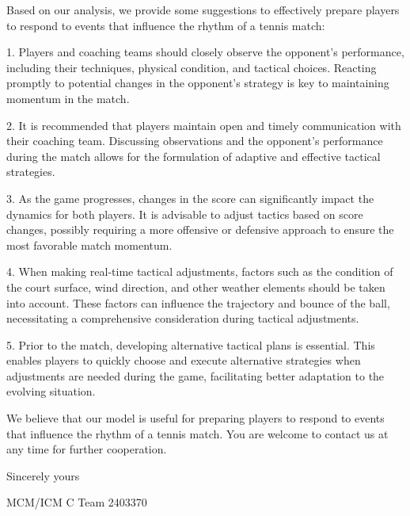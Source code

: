 \documentclass[13pt]{ctexart}
\begin{document}
Based on our analysis, we provide some suggestions to effectively prepare players to respond to events that influence the rhythm of a tennis match:

1. Players and coaching teams should closely observe the opponent's performance, including their techniques, physical condition, and tactical choices. Reacting promptly to potential changes in the opponent's strategy is key to maintaining momentum in the match.

2. It is recommended that players maintain open and timely communication with their coaching team. Discussing observations and the opponent's performance during the match allows for the formulation of adaptive and effective tactical strategies.

3. As the game progresses, changes in the score can significantly impact the dynamics for both players. It is advisable to adjust tactics based on score changes, possibly requiring a more offensive or defensive approach to ensure the most favorable match momentum.

4. When making real-time tactical adjustments, factors such as the condition of the court surface, wind direction, and other weather elements should be taken into account. These factors can influence the trajectory and bounce of the ball, necessitating a comprehensive consideration during tactical adjustments.

5. Prior to the match, developing alternative tactical plans is essential. This enables players to quickly choose and execute alternative strategies when adjustments are needed during the game, facilitating better adaptation to the evolving situation.

We believe that our model is useful for preparing players to respond to events that influence the rhythm of a tennis match. You are welcome to contact us at any time for further cooperation.

\thispagestyle{empty}
{\raggedleft
Sincerely yours

MCM/ICM C Team 2403370\par
}

\newpage
\thispagestyle{empty}
\small
\tableofcontents
\normalsize
\newpage
\setcounter{page}{1}
\end{document}
